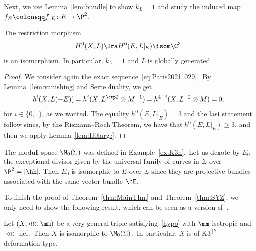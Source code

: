 Next, we use Lemma~\ref{lem:bundle} to show $k_L=1$ and study the induced map $f_E\coloneqq f \vert_E \colon E\to \P^2$.

\begin{lemm}\label{lem:k=1}
The restriction morphism
\[
H^0(X,L)\lra H^0(E, L \vert_E) \isom \C^3
\]
is an isomorphism.
In particular, $k_L=1$ and $L$ is globally generated.
\end{lemm}

\begin{proof}
We consider again the exact sequence~\eqref{eq:Paris20211029}.\
By Lemma~\ref{lem:vanishing} and Serre duality, we get
\[
h^i(X,L (-E)) = h^i(X,L^{\otp 2}\otimes M^{-1})=h^{4-i}(X, L^{-2}\otimes M)=0,
\]
for $i\in\{0,1\}$, as we wanted.
The equality $h^0(E, L \vert_E)=3$ and the last statement follow since, by the Riemann--Roch Theorem, we have that $h^0(E, L \vert_E)\geq 3$, and then we apply Lemma~\ref{lem:H0large}.
\end{proof}

The moduli space $\M_0(\Sigma)$ was defined in Example~\ref{ex:K3n}.\
Let us denote by $E_0$ the exceptional divisor given by the universal family of curves in $\Sigma$ over $\P^2=|\hh |$.
Then $E_0$ is isomorphic to $ E$ over $\Sigma$ since they are projective bundles associated with  the same vector bundle $\cE$.

To finish the proof of Theorem~\ref{thm:MainThm} and Theorem~\ref{thm:SYZ}, we only need to show the following result, which can be seen as a version of~\cite[Theorem 1]{nag}.

\begin{prop}
\notready\label{thm:OGrady}
Let $(X,\lll,\mm)$ be a very general triple satisfying~\eqref{hypo} with $\mm$ isotropic and $\lll$ nef.\
Then $X$ is isomorphic to $\M_0(\Sigma)$.\
In particular, $X$ is of $\mathrm{K3}^{[2]}$ deformation type.
\end{prop}

